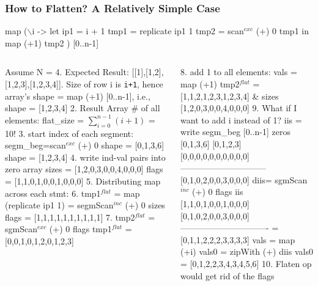 \documentclass{beamer}
\renewcommand{\emph}[1]{\textcolor{structure}{#1}}
\newcommand{\emp}[1]{\textcolor{DikuRed}{ #1}}
\newcommand{\mymath}[1]{$ #1 $}
\newcommand{\myindx}[1]{_{#1}}
\newcommand{\myindu}[1]{^{#1}}
\begin{document}
\begin{frame}[fragile,t]
  \frametitle{How to Flatten? A Relatively Simple Case}
\vspace{-2ex}
\begin{colorcode}
\emph{map} (\mymath{\backslash}i -> let ip1  = i + 1
               tmp1 = \alert{replicate ip1 1}
               tmp2 = \alert{scan\mymath{\myindu{exc}} (+) 0 tmp1}
           in         \alert{map (+1) tmp2}     ) [0..n-1]
\end{colorcode}
\begin{columns}
\begin{colorcode}[fontsize=\scriptsize]
Assume N = 4. Expected Result:
\emph{[[1],[1,2],[1,2,3],[1,2,3,4]]}. Size of row i is {\tt i+1}, hence
   array's shape = map (+1) [0..n-1],
   i.e., shape = [1,2,3,4]
2. Result Array \# of all elements:
    flat\_size = \mymath{\sum\myindx{i=0}\myindu{n-1}(i+1)} = 10!
3. start index of each segment:
   segm_beg=scan\mymath{\myindu{exc}} (+) 0 shape
           = [0,1,3,6]
   shape   = [1,2,3,4]
4. write ind-val pairs into zero array
   sizes = [1,2,0,3,0,0,4,0,0,0]
   flags = [1,1,0,1,0,0,1,0,0,0]
5. \emph{Distributing map across each stmt:}
6. tmp1\mymath{\myindu{flat}} = map (replicate ip1 1) = 
          segmScan\mymath{\myindu{inc}} (+) 0 sizes flags
   = [1,1,1,1,1,1,1,1,1,1]
7. tmp2\mymath{\myindu{flat}} = sgmScan\mymath{\myindu{exc}} (+) 0 flags tmp1\mymath{\myindu{flat}}
   = [0,0,1,0,1,2,0,1,2,3]
\end{colorcode}
\begin{colorcode}[fontsize=\scriptsize]
8.  \emp{add 1 to all elements:}
   vals = map (+1) tmp2\mymath{\myindu{flat}}
        =  \emph{[1,1,2,1,2,3,1,2,3,4]}
   \& sizes \emph{[1,2,0,3,0,0,4,0,0,0]}
9. \alert{What if I want to add i instead of 1?}\pause
   \emp{iis = write segm_beg [0..n-1] zeros}
           [0,1,3,6] [0,1,2,3]
           [0,0,0,0,0,0,0,0,0,0]
         ------------------------------
           [0,1,0,2,0,0,3,0,0,0]
   \emp{diis= sgmScan\mymath{\myindu{inc}} (+) 0 flags iis}
         [1,1,0,1,0,0,1,0,0,0]
         [0,1,0,2,0,0,3,0,0,0]
        -------------------------------
       = [0,1,1,2,2,2,3,3,3,3]
   \emp{vals = map (+i) vals0}
        \emp{= zipWith (+) diis vals0}
        = [0,1,2,2,3,4,3,4,5,6]
10. \emp{Flaten op would get rid of the flags}
\end{colorcode}
\end{columns}

\end{frame}
\end{document}

